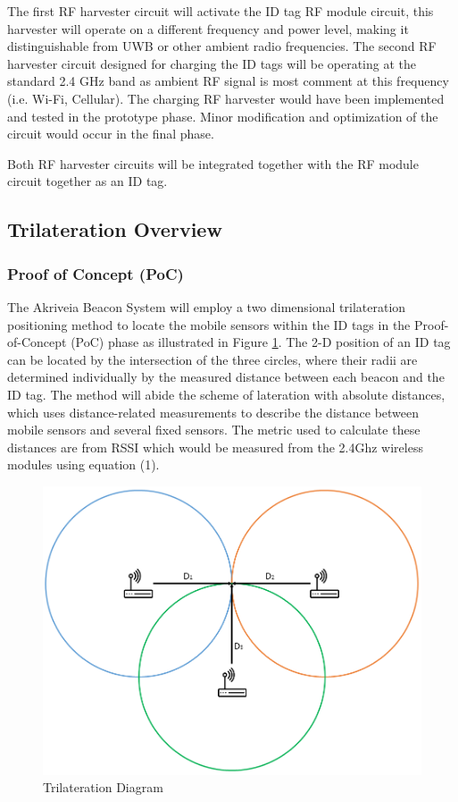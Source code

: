 \bigskip
The first RF harvester circuit will activate the ID tag RF module circuit, this harvester will operate
on a different frequency and power level, making it distinguishable from UWB or other ambient radio frequencies. The second RF harvester circuit designed for charging the ID tags will be operating at the standard 2.4 GHz band  as ambient RF signal is most comment at this frequency (i.e. Wi-Fi, Cellular). The charging RF harvester would have been implemented and tested in the prototype phase. Minor modification and optimization of the circuit would occur in the final phase.

\bigskip
Both RF harvester circuits will be integrated together with the RF module circuit together as an ID tag.

\break
\subsection{Trilateration Overview}
\bigskip
\subsubsection{Proof of Concept (PoC)}
The Akriveia Beacon System will employ a two dimensional trilateration positioning method to locate the mobile sensors within the ID tags in the Proof-of-Concept (PoC) phase as illustrated in Figure \ref{Tri}. The 2-D position of an ID tag can be located by the intersection of the three circles, where their radii  are determined individually by the measured distance between each beacon and the ID tag. The method will abide the scheme of lateration with absolute distances, which uses distance-related measurements to describe the distance between mobile sensors and several fixed sensors. The metric used to calculate these distances are from RSSI which would be measured from the 2.4Ghz wireless modules using equation (1).
\medskip
\begin{figure}[h!]
    \centering
    \includegraphics[scale=0.40]{./images/Tri.png}
    \caption{Trilateration Diagram}
    \label{Tri}
\end{figure}

